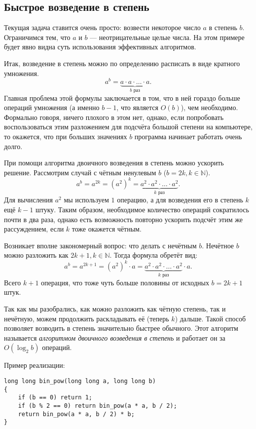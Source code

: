 \subsection{Быстрое возведение в степень}
Текущая задача ставится очень просто: возвести некоторое число \(a\) в степень \(b\). Ограничимся тем, что $a$ и $b$ --- неотрицательные целые числа. На этом примере будет явно видна суть использования эффективных алгоритмов.

Итак, возведение в степень можно по определению расписать в виде кратного умножения.
\[a^b=\underbrace{a \cdot a \cdot  \ldots \cdot a}_\text{\(b\) раз}.\]
Главная проблема этой формулы заключается в том, что в ней гораздо больше операций умножения (а именно $b - 1$, что является \(O(b)\)), чем необходимо. Формально говоря, ничего плохого в этом нет, однако, если попробовать воспользоваться этим разложением для подсчёта большой степени на компьютере, то окажется, что при больших значениях \(b\) программа начинает работать очень долго.

При помощи алгоритма двоичного возведения в степень можно ускорить решение. Рассмотрим случай с чётным ненулевым $b$ (\(b = 2k, k \in \mathbb{N}\)).
\[a^b = a^{2k} = (a^{2})^k = \underbrace{a^2 \cdot a^2 \cdot \ldots \cdot a^2}_\text{\(k\) раз}.\]
Для вычисления $a^2$ мы используем $1$ операцию, а для возведения его в степень $k$ ещё $k - 1$ штуку. Таким образом, необходимое количество операций сократилось почти в два раза, однако есть возможность повторно ускорить подсчёт этим же рассуждением, если $k$ тоже окажется чётным.

Возникает вполне закономерный вопрос: что делать с нечётным $b$. Нечётное $b$ можно разложить как $2k + 1, k \in \mathbb{N}$. Тогда формула обретёт вид:
\[a^b = a^{2k + 1} = (a^{2})^k \cdot a = \underbrace{a^2 \cdot a^2 \cdot \ldots \cdot a^2}_\text{\(k\) раз} \cdot a.\]
Всего $k + 1$ операция, что тоже чуть больше половины от исходных $b = 2k + 1$ штук.

Так как мы разобрались, как можно разложить как чётную степень, так и нечётную, можем продолжить раскладывать её (теперь $k$) дальше. Такой способ позволяет возводить в степень значительно быстрее обычного. Этот алгоритм называется \emph{алгоритмом двоичного возведения в степень} и работает он за \(O(\log_2{b})\) операций.


Пример реализации:
\begin{lstlisting}
long long bin_pow(long long a, long long b)
{
    if (b == 0) return 1;
    if (b % 2 == 0) return bin_pow(a * a, b / 2);
    return bin_pow(a * a, b / 2) * b;
}
\end{lstlisting}